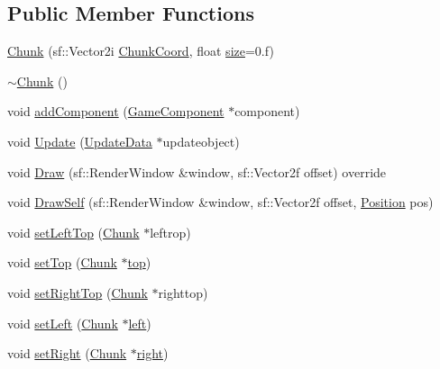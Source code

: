 \subsection*{Public Member Functions}
\begin{DoxyCompactItemize}
\item 
\hyperlink{class_chunk_ad46cf5f6f874fbeff528ef237251a9f2}{Chunk} (sf\-::\-Vector2i \hyperlink{class_chunk_abb5b1842148b3d7c616065766bfd2b33}{Chunk\-Coord}, float \hyperlink{class_chunk_af46410b580baf2985b01044d5c041b2e}{size}=0.f)
\item 
\hyperlink{class_chunk_ad21b515f41c9a1d21740b9e7e3f8eede}{$\sim$\-Chunk} ()
\item 
void \hyperlink{class_chunk_aa5b5c5515c800f2171899caf704db5dc}{add\-Component} (\hyperlink{class_game_component}{Game\-Component} $\ast$component)
\item 
void \hyperlink{class_chunk_a750907d92efc9e45bfff5e280fa55afe}{Update} (\hyperlink{class_update_data}{Update\-Data} $\ast$updateobject)
\item 
void \hyperlink{class_chunk_a3203da1471b5572e0dd2cd82e6dceb42}{Draw} (sf\-::\-Render\-Window \&window, sf\-::\-Vector2f offset) override
\item 
void \hyperlink{class_chunk_a238c9e4adf0dfc78d6b8c778aec66e69}{Draw\-Self} (sf\-::\-Render\-Window \&window, sf\-::\-Vector2f offset, \hyperlink{_chunk_8hpp_ab91b34ae619fcdfcba4522b4f335bf83}{Position} pos)
\item 
void \hyperlink{class_chunk_ac747f2b3da1e583e3b64ca328bf04d77}{set\-Left\-Top} (\hyperlink{class_chunk}{Chunk} $\ast$leftrop)
\item 
void \hyperlink{class_chunk_a6cc69f33389b5510766f23317ff7ae65}{set\-Top} (\hyperlink{class_chunk}{Chunk} $\ast$\hyperlink{_chunk_8hpp_ab91b34ae619fcdfcba4522b4f335bf83a3961740aa293a50c701d278225f7050a}{top})
\item 
void \hyperlink{class_chunk_a8c19057f7360349f5d214bfa50d51900}{set\-Right\-Top} (\hyperlink{class_chunk}{Chunk} $\ast$righttop)
\item 
void \hyperlink{class_chunk_aa0005654a92c0ca50f90c516d508834c}{set\-Left} (\hyperlink{class_chunk}{Chunk} $\ast$\hyperlink{_chunk_8hpp_ab91b34ae619fcdfcba4522b4f335bf83ab0ac36b187aa60c167ffcead3d5a03c0}{left})
\item 
void \hyperlink{class_chunk_a670d58217b329583811b5380f25700d6}{set\-Right} (\hyperlink{class_chunk}{Chunk} $\ast$\hyperlink{_chunk_8hpp_ab91b34ae619fcdfcba4522b4f335bf83af763d610923b0c4614e8ecd65212666a}{right})

\end{DoxyCompactItemize}
